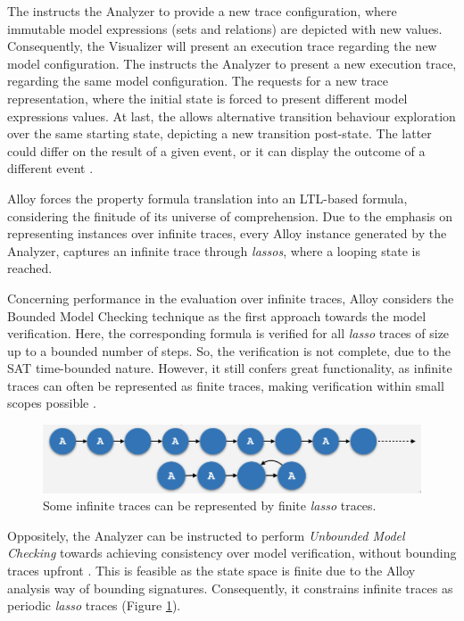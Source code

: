 The  instructs the Analyzer to provide a new trace configuration, where immutable model expressions (sets and relations) are depicted with new values. Consequently, the Visualizer will present an execution trace regarding the new model configuration. The  instructs the Analyzer to present a new execution trace, regarding the same model configuration. The  requests for a new trace representation, where the initial state is forced to present different model expressions values. At last, the  allows alternative transition behaviour exploration over the same starting state, depicting a new transition post-state. The latter could differ on the result of a given event, or it can display the outcome of a different event \cite{alloy-docs}.

Alloy forces the property formula translation into an LTL-based formula, considering the finitude of its universe of comprehension. Due to the emphasis on representing instances over infinite traces, every Alloy instance generated by the Analyzer, captures an infinite trace through \textit{lassos}, where a looping state is reached.

Concerning performance in the evaluation over infinite traces, Alloy considers the Bounded Model Checking technique as the first approach towards the model verification. Here, the corresponding formula is verified for all \textit{lasso} traces of size up to a bounded number of steps. So, the verification is not complete, due to the SAT time-bounded nature. However, it still confers great functionality, as infinite traces can often be represented as finite traces, making verification within small scopes possible \cite{jackson2012software}.

\begin{figure}[H]
    \centering
    \includegraphics[width=0.7\linewidth]{images/alloy_infinite_trace.png}
    \caption{Some infinite traces can be represented by finite \textit{lasso} traces.}
    \label{fig:alloy-infinite}
\end{figure}

Oppositely, the Analyzer can be instructed to perform \textit{Unbounded Model Checking} towards achieving consistency over model verification, without bounding traces upfront \cite{alloy-6, alloy-docs}. This is feasible as the state space is finite due to the Alloy analysis way of bounding signatures. Consequently, it constrains infinite traces as periodic \textit{lasso} traces (Figure \ref{fig:alloy-infinite}).

